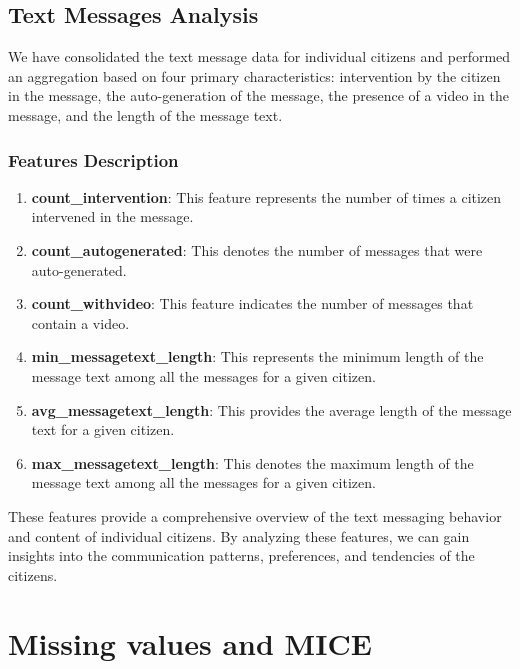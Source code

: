 \documentclass[12pt]{article}
\begin{document}
\subsection{Text Messages Analysis}

We have consolidated the text message data for individual citizens and performed an aggregation based on four primary characteristics: intervention by the citizen in the message, the auto-generation of the message, the presence of a video in the message, and the length of the message text.

\subsubsection{Features Description}

\begin{enumerate}
    \item \textbf{count\_intervention}: This feature represents the number of times a citizen intervened in the message.
    
    \item \textbf{count\_autogenerated}: This denotes the number of messages that were auto-generated.
    
    \item \textbf{count\_withvideo}: This feature indicates the number of messages that contain a video.
    
    \item \textbf{min\_messagetext\_length}: This represents the minimum length of the message text among all the messages for a given citizen.
    
    \item \textbf{avg\_messagetext\_length}: This provides the average length of the message text for a given citizen.
    
    \item \textbf{max\_messagetext\_length}: This denotes the maximum length of the message text among all the messages for a given citizen.
\end{enumerate}

These features provide a comprehensive overview of the text messaging behavior and content of individual citizens. By analyzing these features, we can gain insights into the communication patterns, preferences, and tendencies of the citizens.

\section{Missing values and MICE}
\end{document}
